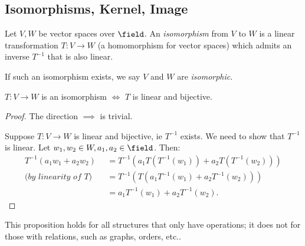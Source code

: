 \subsection{Isomorphisms, Kernel, Image}

\begin{definition}[Isomorphism]
Let $V, W$ be vector spaces over $\field$. An \emph{isomorphism} from $V$ to $W$ is a linear transformation $T: V \to W$ (a homomorphism for vector spaces) which admits an inverse $T^{-1}$ that is also linear.

If such an isomorphism exists, we say $V$ and $W$ are \emph{isomorphic}.
\end{definition}

\begin{proposition}
    $T: V \to W$ is an isomorphism $\iff$ $T$ is linear and bijective.
\end{proposition}

\begin{proof}
    The direction $\implies$ is trivial.

    Suppose $T: V \to W$ is linear and bijective, ie $T^{-1}$ exists. We need to show that $T^{-1}$ is linear. Let $w_1, w_2 \in W, a_1, a_2 \in \field$. Then: 
    \begin{align*}
        T^{-1}(a_1 w_1 + a_2 w_2) &= T^{-1}(a_1T(T^{-1}(w_1)) + a_2 T(T^{-1}(w_2)))\\
        \textit{(by linearity of $T$)}\quad&= T^{-1}(T(a_1T^{-1}(w_1) + a_2T^{-1}(w_2))) \\
        &= a_1T^{-1}(w_1) + a_2 T^{-1}(w_2).
    \end{align*}
\end{proof}

\begin{remark}
    This proposition holds for all structures that only have operations; it does not for those with relations, such as graphs, orders, etc..
\end{remark}

